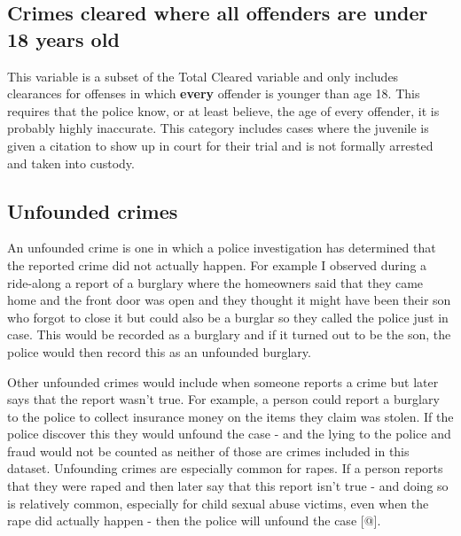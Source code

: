 \documentclass[
  12pt,
  openany]{book}
\begin{document}
\hypertarget{crimes-cleared-where-all-offenders-are-under-18-years-old}{%
\subsection{Crimes cleared where all offenders are under 18 years old}\label{crimes-cleared-where-all-offenders-are-under-18-years-old}}

This variable is a subset of the Total Cleared variable and only includes clearances for offenses in which \textbf{every} offender is younger than age 18. This requires that the police know, or at least believe, the age of every offender, it is probably highly inaccurate. This category includes cases where the juvenile is given a citation to show up in court for their trial and is not formally arrested and taken into custody.

\hypertarget{unfounded-crimes}{%
\subsection{Unfounded crimes}\label{unfounded-crimes}}

An unfounded crime is one in which a police investigation has determined that the reported crime did not actually happen. For example I observed during a ride-along a report of a burglary where the homeowners said that they came home and the front door was open and they thought it might have been their son who forgot to close it but could also be a burglar so they called the police just in case. This would be recorded as a burglary and if it turned out to be the son, the police would then record this as an unfounded burglary.

Other unfounded crimes would include when someone reports a crime but later says that the report wasn't true. For example, a person could report a burglary to the police to collect insurance money on the items they claim was stolen. If the police discover this they would unfound the case - and the lying to the police and fraud would not be counted as neither of those are crimes included in this dataset. Unfounding crimes are especially common for rapes. If a person reports that they were raped and then later say that this report isn't true - and doing so is relatively common, especially for child sexual abuse victims, even when the rape did actually happen - then the police will unfound the case {[}@{]}.
\end{document}
